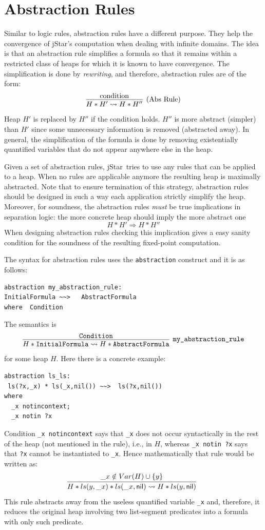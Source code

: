 \documentclass[11pt]{article}
\newcommand{\jStar}{{\sf jStar}}
\newcommand{\nil}{{\sf nil}}
\begin{document}
\section{Abstraction Rules}
\label{sec:abstraction-rules}
Similar to logic rules, abstraction rules have a different purpose. They help the convergence of \jStar's computation when dealing with infinite domains. The idea is that an abstraction rule simplifies 
a formula so that it remains within a restricted class of heaps for which it is known to have 
convergence. The simplification is done by {\em rewriting}, and therefore,  
 abstraction rules are of the form:
\[
\infer[\mbox{(Abs Rule)}]{H* H' \leadsto H *H''}{ \mbox{condition}}
\]
Heap $H'$ is replaced by $H''$ if the condition holds.  $H''$ is
more abstract (simpler) than $H'$ since some unnecessary information is removed
(abstracted away).  In general, the simplification of the formula is
done by removing existentially quantified variables that do not appear
anywhere else in the heap. 

Given a set of abstraction rules, \jStar \  tries to use
any rules that can be applied to a heap. When no rules are applicable
anymore the resulting heap is maximally abstracted. 
Note that to ensure termination of this strategy, abstraction rules should be designed in 
such a way each application strictly simplify the heap.
Moreover, for soundness, the abstraction rules {\em must}
be true implications in separation logic: the more concrete heap
should imply the more abstract one
\[
H*H' \Longrightarrow H*H''
\]
When designing abstraction rules
checking this implication gives a easy sanity condition for the 
soundness of the resulting fixed-point computation.

The syntax for abstraction rules uses the {\tt abstraction} construct and it is as follows:
\begin{verbatim}
abstraction my_abstraction_rule:
InitialFormula ~~>   AbstractFormula   
where  Condition
\end{verbatim}
The semantics  is
\[
\infer[\texttt{my\_abstraction\_rule}]
{H* \texttt{InitialFormula} \leadsto H*\texttt{AbstractFormula} }{\texttt{Condition}}
\] for some heap $H$. Here there is a concrete example:
\begin{verbatim}
abstraction ls_ls:
 ls(?x,_x) * ls(_x,nil()) ~~>  ls(?x,nil())
where 
  _x notincontext;
  _x notin ?x
\end{verbatim}
Condition {\tt \_x notincontext} says that {\tt \_x} does not occur syntactically in the rest of the heap (not mentioned in the rule), i.e., in $H$, whereas {\tt \_x notin ?x} says that {\tt ?x} cannot be instantiated to {\tt \_x}. Hence mathematically that rule would be written as:
\[
\infer[]
{H*ls(y,\_x)*ls(\_x,\nil) \leadsto H*ls(y,\nil)}
{\_x \notin Var(H) \cup \{ y \} }
\] This rule abstracts away from the useless quantified variable {\tt \_x} and, therefore, it reduces the original heap involving two list-segment predicates into a formula with only such predicate.
\end{document}
